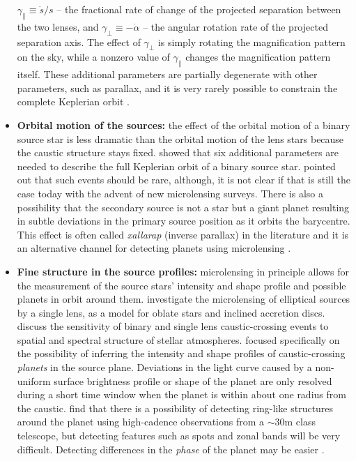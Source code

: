 \documentclass[12pt,dvipsnames]{report}
\begin{document}
\begin{itemize}
          $\gamma_\parallel\equiv \dot{s}/s$ -- the fractional rate of change of the projected
          separation between the two lenses, and $\gamma_{\perp} \equiv-\dot{\alpha}$ --
          the angular rotation rate of the projected separation axis. The effect of
          $\gamma_\perp$ is simply rotating the magnification pattern on the sky, while a
          nonzero value of $\gamma_\parallel$ changes the magnification pattern itself. 
          These additional parameters are
          partially degenerate with other parameters, such as parallax, and it is very
          rarely possible to constrain the complete Keplerian orbit
          \citep{2011ApJ...738...87S,2020A&A...633A..98W}.
    \item \textbf{Orbital motion of the sources:} the effect of the orbital motion of a binary
          source star is less dramatic than the orbital motion of the lens stars because
          the caustic structure stays fixed. \citet{1998A&A...329..361D} showed that six
          additional parameters are needed to describe the full Keplerian orbit of a
          binary source star. \citet{1992ApJ...397..362G,1993ApJ...407..440G} pointed out
          that such events should be rare, although, it is not clear if that is still the
          case today with the advent of new microlensing surveys.
          There is also a possibility that the secondary source is not a star but a giant 
          planet resulting in subtle deviations in the primary
          source position as it orbits the barycentre. This effect is often 
          called \emph{xallarap} (inverse parallax) in the literature and it is an
          alternative channel for detecting planets using microlensing 
          \citep{2009MNRAS.392.1193R,2021AJ....162...59R,2021AJ....161...84M}.
    \item \textbf{Fine structure in the source profiles:} microlensing in principle allows for
          the measurement of the source stars' intensity and shape profile
          and possible planets in orbit around them. \citet{1997ApJ...490...38H} investigate
          the microlensing of elliptical sources by a single lens, as a model for oblate stars and inclined
          accretion discs. \citet{1999ApJ...513..619G} discuss the sensitivity of binary and single lens
          caustic-crossing events to spatial and spectral structure of stellar atmospheres.
          \citet{2003ApJ...586..527G} focused specifically on the possibility of inferring
          the intensity and shape profiles of caustic-crossing \emph{planets} in the source plane. Deviations
          in the light curve caused by a non-uniform surface brightness profile or shape of the planet are only
          resolved during a short time window when the planet is within about one radius from the caustic.
          \citet{2003ApJ...586..527G} find that there is a possibility of detecting ring-like structures
          around the planet using high-cadence observations from a $\sim 30$m class telescope, but
          detecting features such as spots and zonal bands will be very difficult. Detecting
          differences in the \emph{phase} of the planet may be easier \citep{2001MNRAS.325..305A}.
\end{itemize}
\end{document}
